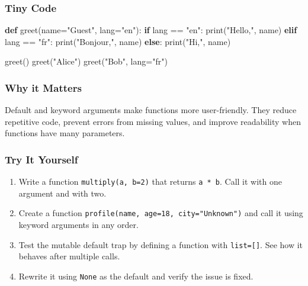 \documentclass[
  letterpaper,
  DIV=11,
  numbers=noendperiod]{scrreprt}
\newenvironment{Shaded}{\begin{snugshade}}{\end{snugshade}}
\newcommand{\BuiltInTok}[1]{\textcolor[rgb]{0.00,0.23,0.31}{#1}}
\newcommand{\ControlFlowTok}[1]{\textcolor[rgb]{0.00,0.23,0.31}{\textbf{#1}}}
\newcommand{\KeywordTok}[1]{\textcolor[rgb]{0.00,0.23,0.31}{\textbf{#1}}}
\newcommand{\NormalTok}[1]{\textcolor[rgb]{0.00,0.23,0.31}{#1}}
\newcommand{\OperatorTok}[1]{\textcolor[rgb]{0.37,0.37,0.37}{#1}}
\newcommand{\StringTok}[1]{\textcolor[rgb]{0.13,0.47,0.30}{#1}}
\providecommand{\tightlist}{%
  \setlength{\itemsep}{0pt}\setlength{\parskip}{0pt}}
\begin{document}
\subsubsection{Tiny Code}\label{tiny-code-32}

\begin{Shaded}
\begin{Highlighting}[]
\KeywordTok{def}\NormalTok{ greet(name}\OperatorTok{=}\StringTok{"Guest"}\NormalTok{, lang}\OperatorTok{=}\StringTok{"en"}\NormalTok{):}
    \ControlFlowTok{if}\NormalTok{ lang }\OperatorTok{==} \StringTok{"en"}\NormalTok{:}
        \BuiltInTok{print}\NormalTok{(}\StringTok{"Hello,"}\NormalTok{, name)}
    \ControlFlowTok{elif}\NormalTok{ lang }\OperatorTok{==} \StringTok{"fr"}\NormalTok{:}
        \BuiltInTok{print}\NormalTok{(}\StringTok{"Bonjour,"}\NormalTok{, name)}
    \ControlFlowTok{else}\NormalTok{:}
        \BuiltInTok{print}\NormalTok{(}\StringTok{"Hi,"}\NormalTok{, name)}

\NormalTok{greet()}
\NormalTok{greet(}\StringTok{"Alice"}\NormalTok{)}
\NormalTok{greet(}\StringTok{"Bob"}\NormalTok{, lang}\OperatorTok{=}\StringTok{"fr"}\NormalTok{)}
\end{Highlighting}
\end{Shaded}

\subsubsection{Why it Matters}\label{why-it-matters-32}

Default and keyword arguments make functions more user-friendly. They
reduce repetitive code, prevent errors from missing values, and improve
readability when functions have many parameters.

\subsubsection{Try It Yourself}\label{try-it-yourself-32}

\begin{enumerate}
\def\labelenumi{\arabic{enumi}.}
\tightlist
\item
  Write a function \texttt{multiply(a,\ b=2)} that returns
  \texttt{a\ *\ b}. Call it with one argument and with two.
\item
  Create a function \texttt{profile(name,\ age=18,\ city="Unknown")} and
  call it using keyword arguments in any order.
\item
  Test the mutable default trap by defining a function with
  \texttt{list={[}{]}}. See how it behaves after multiple calls.
\item
  Rewrite it using \texttt{None} as the default and verify the issue is
  fixed.
\end{enumerate}
\end{document}
